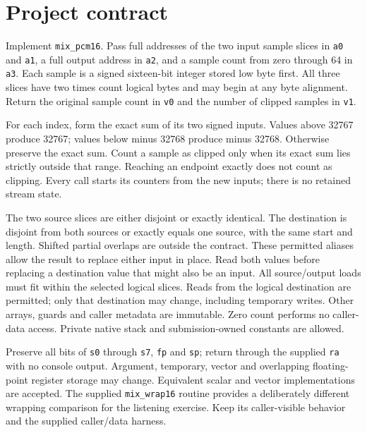 \section*{Project contract}
Implement \texttt{mix\_pcm16}. Pass full addresses of the two input sample slices
in \texttt{a0} and \texttt{a1}, a full output address in \texttt{a2}, and a sample
count from zero through 64 in \texttt{a3}. Each sample is a signed sixteen-bit
integer stored low byte first. All three slices have two times count logical
bytes and may begin at any byte alignment. Return the original sample count in
\texttt{v0} and the number of clipped samples in \texttt{v1}.

For each index, form the exact sum of its two signed inputs. Values above 32767
produce 32767; values below minus 32768 produce minus 32768. Otherwise preserve
the exact sum. Count a sample as clipped only when its exact sum lies strictly
outside that range. Reaching an endpoint exactly does not count as clipping. Every
call starts its counters from the new inputs; there is no retained stream state.

The two source slices are either disjoint or exactly identical. The destination
is disjoint from both sources or exactly equals one source, with the same start
and length. Shifted partial overlaps are outside the contract. These permitted
aliases allow the result to replace either input in place. Read both values before
replacing a destination value that might also be an input. All source/output loads
must fit within the selected logical slices. Reads from the logical destination
are permitted; only that destination may change, including temporary writes.
Other arrays, guards and caller metadata are immutable. Zero count performs no
caller-data access. Private native stack and submission-owned constants are allowed.

Preserve all bits of \texttt{s0} through \texttt{s7}, \texttt{fp} and \texttt{sp};
return through the supplied \texttt{ra} with no console output. Argument, temporary,
vector and overlapping floating-point register storage may change. Equivalent scalar
and vector implementations are accepted. The supplied \texttt{mix\_wrap16} routine
provides a deliberately different wrapping comparison for the listening exercise.
Keep its caller-visible behavior and the supplied caller/data harness.
